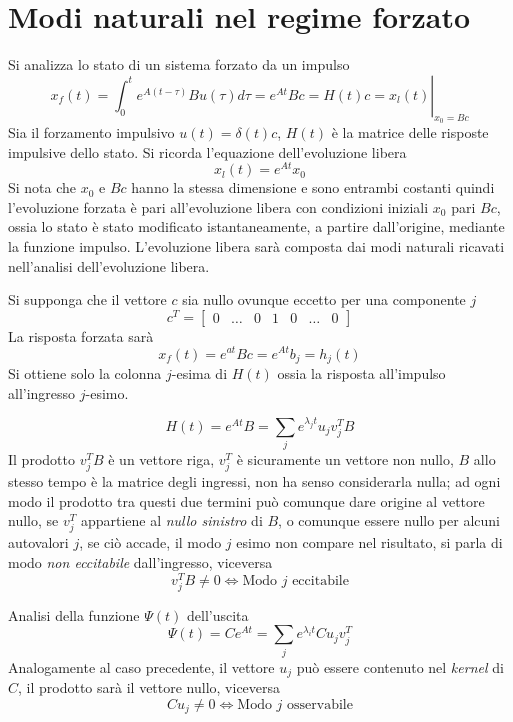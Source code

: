 
\section{Modi naturali nel regime forzato}
Si analizza lo stato di un sistema forzato da un impulso
$$
x_f(t) = \left.\int_{0}^t e^{A(t-\tau)}Bu(\tau) d\tau = e^{At}Bc = H(t)c =
x_l(t)\right|_{x_0=Bc}
$$
Sia il forzamento impulsivo $ u(t)  = \delta(t)c$, $H(t)$ è la matrice delle
risposte impulsive dello stato.
Si ricorda l'equazione dell'evoluzione libera
$$
x_l(t) = e^{At}x_0
$$
Si nota che $x_0$ e $Bc$ hanno la stessa dimensione e sono entrambi costanti
quindi l'evoluzione forzata è pari all'evoluzione libera con condizioni
iniziali $x_0$ pari $Bc$, ossia lo stato è stato modificato istantaneamente, a
partire dall'origine, mediante la funzione impulso.
L'evoluzione libera sarà composta dai modi naturali ricavati nell'analisi
dell'evoluzione libera.

Si supponga che il vettore $c$ sia nullo ovunque eccetto per una componente $j$
$$
c^T= \begin{bmatrix}
0& \ldots & 0 & 1 & 0 & \ldots & 0
\end{bmatrix}
$$
La risposta forzata sarà
$$
x_f(t)=e^{at}Bc = e^{At}b_j = h_j(t)
$$
Si ottiene solo la colonna $j$-esima di $H(t)$ ossia la risposta all'impulso
all'ingresso $j$-esimo.

$$
H(t) = e^{At}B = \sum_j e^{\lambda_j t}u_jv_j^TB
$$
Il prodotto $v_j^TB$ è un vettore riga, $v_j^T$ è sicuramente un vettore non
nullo, $B$ allo stesso tempo è la matrice degli ingressi, non ha senso
considerarla nulla; ad ogni modo il prodotto tra questi due termini può
comunque dare origine al vettore nullo, se $v_j^T$ appartiene al \textit{nullo
sinistro} di $B$, o comunque essere nullo per alcuni autovalori $j$, se ciò
accade, il modo $j$ esimo non compare nel risultato, si parla di modo
\textit{non eccitabile} dall'ingresso, viceversa
$$
v_j^TB \neq 0 \Leftrightarrow \text{Modo $j$ eccitabile}
$$

Analisi della funzione $\Psi(t)$ dell'uscita
$$
\Psi(t) = Ce^{At} = \sum_j e^{\lambda_i t} Cu_jv_j^T
$$
Analogamente al caso precedente, il vettore $u_j$ può essere contenuto nel
\textit{kernel} di $C$, il prodotto sarà il vettore nullo, viceversa
$$
Cu_j\neq 0 \Leftrightarrow \text{Modo $j$ osservabile}
$$

